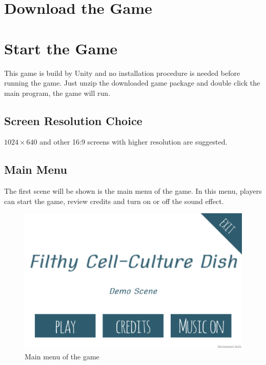 \documentclass[12pt,a4paper,twoside]{scrartcl}
\begin{document}
\section{Download the Game}

\section{Start the Game}
This game is build by Unity and no installation procedure is needed before running the game. Just unzip the downloaded game package and double click the main program, the game will run.

\subsection{Screen Resolution Choice}

$1024\times640$ and other 16:9 screens with higher resolution are suggested.

\subsection{Main Menu}
The first scene will be shown is the main menu of the game. In this menu, players can start the game, review credits and turn on or off the sound effect.
\begin{figure}[h] 
	\centering
	\includegraphics[scale=0.2]{start1}
	\caption{Main menu of the game}
\end{figure}
\end{document}

